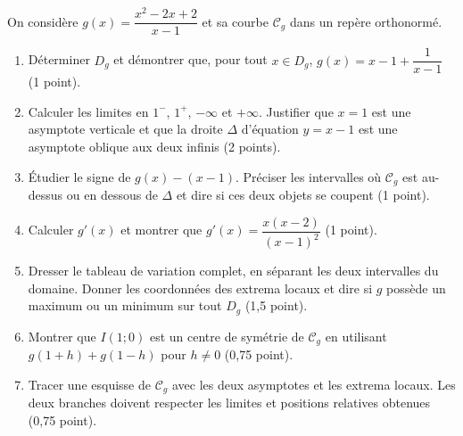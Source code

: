 \label{t11s-ds1-e02}\par
On considère $g(x)=\dfrac{x^2-2x+2}{x-1}$ et sa courbe $\mathcal C_g$ dans un repère orthonormé.
\begin{enumerate}
\item Déterminer $D_g$ et démontrer que, pour tout $x\in D_g$, $g(x)=x-1+\dfrac1{x-1}$ (1 point).
\item Calculer les limites en $1^-$, $1^+$, $-\infty$ et $+\infty$. Justifier que $x=1$ est une asymptote verticale et que la droite $\Delta$ d’équation $y=x-1$ est une asymptote oblique aux deux infinis (2 points).
\item Étudier le signe de $g(x)-(x-1)$. Préciser les intervalles où $\mathcal C_g$ est au-dessus ou en dessous de $\Delta$ et dire si ces deux objets se coupent (1 point).
\item Calculer $g'(x)$ et montrer que $g'(x)=\dfrac{x(x-2)}{(x-1)^2}$ (1 point).
\item Dresser le tableau de variation complet, en séparant les deux intervalles du domaine. Donner les coordonnées des extrema locaux et dire si $g$ possède un maximum ou un minimum sur tout $D_g$ (1,5 point).
\item Montrer que $I(1;0)$ est un centre de symétrie de $\mathcal C_g$ en utilisant $g(1+h)+g(1-h)$ pour $h\ne0$ (0,75 point).
\item Tracer une esquisse de $\mathcal C_g$ avec les deux asymptotes et les extrema locaux. Les deux branches doivent respecter les limites et positions relatives obtenues (0,75 point).
\end{enumerate}
